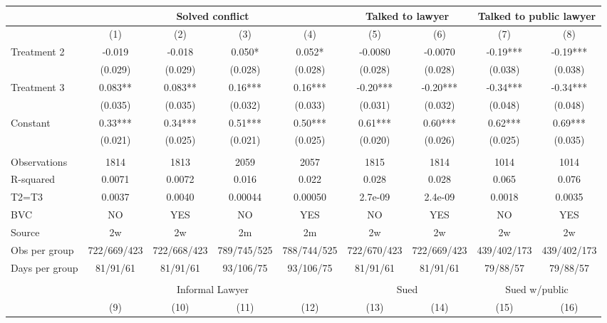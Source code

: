 \begin{tabular}{lcccccccc}
\toprule
      & \multicolumn{4}{c}{Solved conflict} & \multicolumn{2}{c}{Talked to lawyer} & \multicolumn{2}{c}{Talked to public lawyer} \\
\midrule
\midrule
      & (1)   & (2)   & (3)   & (4)   & (5)   & (6)   & (7)   & (8) \\
\midrule
\midrule
Treatment 2 & -0.019 & -0.018 & 0.050* & 0.052* & -0.0080 & -0.0070 & -0.19*** & -0.19*** \\
      & (0.029) & (0.029) & (0.028) & (0.028) & (0.028) & (0.028) & (0.038) & (0.038) \\
Treatment 3 & 0.083** & 0.083** & 0.16*** & 0.16*** & -0.20*** & -0.20*** & -0.34*** & -0.34*** \\
      & (0.035) & (0.035) & (0.032) & (0.033) & (0.031) & (0.032) & (0.048) & (0.048) \\
Constant  & 0.33*** & 0.34*** & 0.51*** & 0.50*** & 0.61*** & 0.60*** & 0.62*** & 0.69*** \\
      & (0.021) & (0.025) & (0.021) & (0.025) & (0.020) & (0.026) & (0.025) & (0.035) \\
      &       &       &       &       &       &       &       &  \\
\midrule
Observations & 1814  & 1813  & 2059  & 2057  & 1815  & 1814  & 1014  & 1014 \\
R-squared & 0.0071 & 0.0072 & 0.016 & 0.022 & 0.028 & 0.028 & 0.065 & 0.076 \\
T2=T3 & 0.0037 & 0.0040 & 0.00044 & 0.00050 & 2.7e-09 & 2.4e-09 & 0.0018 & 0.0035 \\
BVC   & NO    & YES   & NO    & YES   & NO    & YES   & NO    & YES \\
Source & 2w    & 2w    & 2m    & 2m    & 2w    & 2w    & 2w    & 2w \\
Obs per group & 722/669/423 & 722/668/423 & 789/745/525 & 788/744/525 & 722/670/423 & 722/669/423 & 439/402/173 & 439/402/173 \\
Days per group & 81/91/61 & 81/91/61 & 93/106/75 & 93/106/75 & 81/91/61 & 81/91/61 & 79/88/57 & 79/88/57 \\
\midrule
\midrule
      &       &       &       &       &       &       &       &  \\
\midrule
      & \multicolumn{4}{c}{Informal Lawyer} & \multicolumn{2}{c}{Sued} & \multicolumn{2}{c}{Sued w/public} \\
\midrule
\midrule
      & (9)   & (10)  & (11)  & (12)  & (13)  & (14)  & (15)  & (16) \\

\end{tabular}
